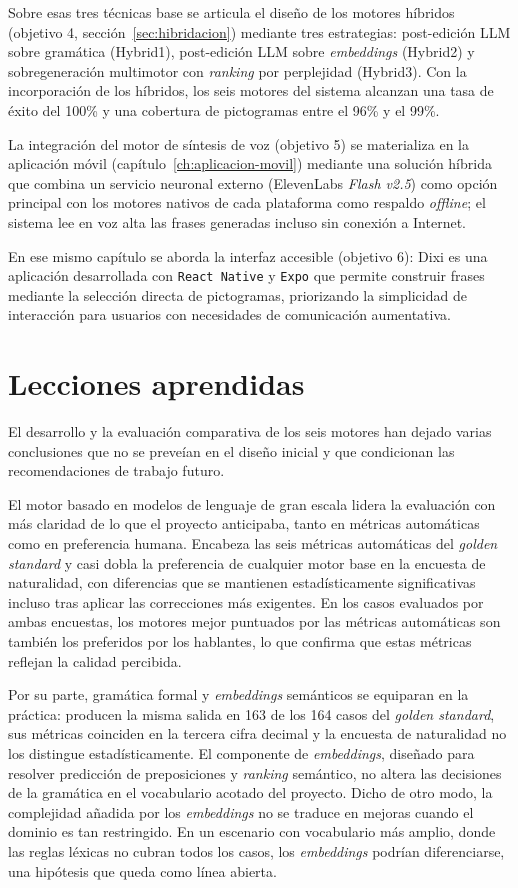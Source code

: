 Sobre esas tres técnicas base se articula el diseño de los motores híbridos (objetivo 4, sección~\ref{sec:hibridacion}) mediante tres estrategias: post-edición LLM sobre gramática (Hybrid1), post-edición LLM sobre \textit{embeddings} (Hybrid2) y sobregeneración multimotor con \textit{ranking} por perplejidad (Hybrid3). Con la incorporación de los híbridos, los seis motores del sistema alcanzan una tasa de éxito del 100\% y una cobertura de pictogramas entre el 96\% y el 99\%.

La integración del motor de síntesis de voz (objetivo 5) se materializa en la aplicación móvil (capítulo~\ref{ch:aplicacion-movil}) mediante una solución híbrida que combina un servicio neuronal externo (ElevenLabs \textit{Flash v2.5}) como opción principal con los motores nativos de cada plataforma como respaldo \textit{offline}; el sistema lee en voz alta las frases generadas incluso sin conexión a Internet.

En ese mismo capítulo se aborda la interfaz accesible (objetivo 6): Dixi es una aplicación desarrollada con \texttt{React Native} y \texttt{Expo} que permite construir frases mediante la selección directa de pictogramas, priorizando la simplicidad de interacción para usuarios con necesidades de comunicación aumentativa.

\section{Lecciones aprendidas}

El desarrollo y la evaluación comparativa de los seis motores han dejado varias conclusiones que no se preveían en el diseño inicial y que condicionan las recomendaciones de trabajo futuro.

El motor basado en modelos de lenguaje de gran escala lidera la evaluación con más claridad de lo que el proyecto anticipaba, tanto en métricas automáticas como en preferencia humana. Encabeza las seis métricas automáticas del \textit{golden standard} y casi dobla la preferencia de cualquier motor base en la encuesta de naturalidad, con diferencias que se mantienen estadísticamente significativas incluso tras aplicar las correcciones más exigentes. En los casos evaluados por ambas encuestas, los motores mejor puntuados por las métricas automáticas son también los preferidos por los hablantes, lo que confirma que estas métricas reflejan la calidad percibida.

Por su parte, gramática formal y \textit{embeddings} semánticos se equiparan en la práctica: producen la misma salida en 163 de los 164 casos del \textit{golden standard}, sus métricas coinciden en la tercera cifra decimal y la encuesta de naturalidad no los distingue estadísticamente. El componente de \textit{embeddings}, diseñado para resolver predicción de preposiciones y \textit{ranking} semántico, no altera las decisiones de la gramática en el vocabulario acotado del proyecto. Dicho de otro modo, la complejidad añadida por los \textit{embeddings} no se traduce en mejoras cuando el dominio es tan restringido. En un escenario con vocabulario más amplio, donde las reglas léxicas no cubran todos los casos, los \textit{embeddings} podrían diferenciarse, una hipótesis que queda como línea abierta.


